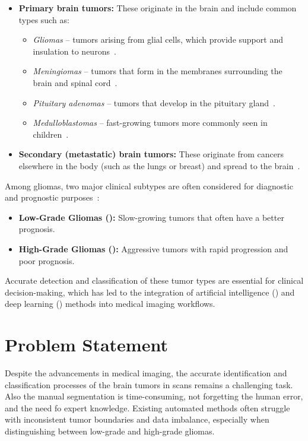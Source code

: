 \begin{itemize}
	\item \textbf{Primary brain tumors:} These originate in the brain and include common types such as:
	      \begin{itemize}
		      \item \textit{Gliomas} – tumors arising from glial cells, which provide support and insulation to neurons~\cite{louis2016who}.
		      \item \textit{Meningiomas} – tumors that form in the membranes surrounding the brain and spinal cord~\cite{mayo_clinic}.
		      \item \textit{Pituitary adenomas} – tumors that develop in the pituitary gland~\cite{mayo_clinic}.
		      \item \textit{Medulloblastomas} – fast-growing tumors more commonly seen in children~\cite{cancer_gov}.
	      \end{itemize}

	\item \textbf{Secondary (metastatic) brain tumors:} These originate from cancers elsewhere in the body (such as the lungs or breast) and spread to the brain~\cite{cancer_gov}.
\end{itemize}

Among gliomas, two major clinical subtypes are often considered for diagnostic and prognostic purposes~\cite{louis2016who}:

\begin{itemize}
	\item \textbf{Low-Grade Gliomas ():} Slow-growing tumors that often have a better prognosis.
	\item \textbf{High-Grade Gliomas ():} Aggressive tumors with rapid progression and poor prognosis.
\end{itemize}

Accurate detection and classification of these tumor types are essential for clinical decision-making, which has led to the integration of artificial intelligence () and deep learning () methods into medical imaging workflows.


\section{Problem Statement}
Despite the advancements in medical imaging, the accurate identification and classification processes of the brain tumors in  scans remains a challenging task. Also the manual segmentation is time-consuming, not forgetting the human error, and the need fo expert knowledge. Existing automated methods often struggle with inconsistent tumor boundaries and data imbalance, especially when distinguishing between low-grade and high-grade gliomas.

